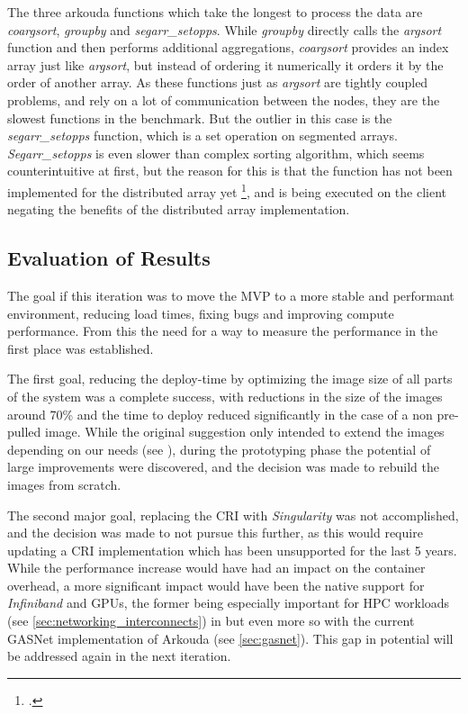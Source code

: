 The three arkouda functions which take the longest to process the data are
\textit{coargsort}, \textit{groupby} and \textit{segarr\_setopps}.
While \textit{groupby} directly calls the \textit{argsort} function and then performs
additional aggregations, \textit{coargsort} provides an index array just like \textit{argsort},
but instead of ordering it numerically it orders it by the order of another array.
As these functions just as \textit{argsort} are tightly coupled problems,
and rely on a lot of communication between the nodes, they are the slowest functions in the benchmark.
But the outlier in this case is the \textit{segarr\_setopps} function, which is a set operation on segmented arrays.
\textit{Segarr\_setopps} is even slower than complex sorting algorithm,
which seems counterintuitive at first, but the reason for this is that the function
has not been implemented for the distributed array yet \footcite{arkouda-docsSegArraysArkoudaArkouda},
and is being executed on the client negating the benefits of the distributed array implementation.

\subsection{Evaluation of Results}

The goal if this iteration was to move the \ac{MVP} to a more stable and performant environment,
reducing load times, fixing bugs and improving compute performance.
From this the need for a way to measure the performance in the first place was established.

The first goal, reducing the deploy-time by optimizing the image size of all parts of the system was
a complete success, with reductions in the size of the images around 70\% and the time to
deploy reduced significantly in the case of a non pre-pulled image.
While the original suggestion only intended to extend the images depending on our needs (see ),
during the prototyping phase the potential of large improvements were discovered,
and the decision was made to rebuild the images from scratch.

The second major goal, replacing the \ac{CRI} with \textit{Singularity} was not accomplished,
and the decision was made to not pursue this further,
as this would require updating a \ac{CRI} implementation which has been unsupported for the last 5 years.
While the performance increase would have had an impact on the container overhead,
a more significant impact would have been the native support for \textit{Infiniband} and \ac{GPU}s,
the former being especially important for \ac{HPC} workloads (see \ref{sec:networking_interconnects})
in but even more so with the current \ac{GASNet} implementation of Arkouda (see \ref{sec:gasnet}).
This gap in potential will be addressed again in the next iteration.

